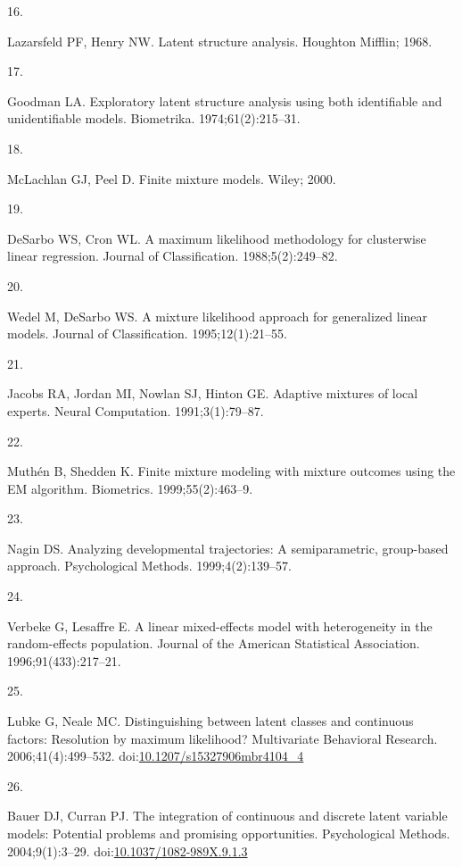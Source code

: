 \documentclass[
  11pt,
]{article}
\newlength{\cslhangindent}
\newlength{\csllabelwidth}
\newenvironment{CSLReferences}[2] %
 {\begin{list}{}{%
  \setlength{\itemindent}{0pt}
  \setlength{\leftmargin}{0pt}
  \setlength{\parsep}{0pt}
  \ifodd #1
   \setlength{\leftmargin}{\cslhangindent}
   \setlength{\itemindent}{-1\cslhangindent}
  \fi
  \setlength{\itemsep}{#2\baselineskip}}}
 {\end{list}}
\newcommand{\CSLLeftMargin}[1]{\parbox[t]{\csllabelwidth}{\strut#1\strut}}
\newcommand{\CSLRightInline}[1]{\parbox[t]{\linewidth - \csllabelwidth}{\strut#1\strut}}
\begin{document}
\begin{CSLReferences}{0}{1}
\CSLLeftMargin{16. }%
\CSLRightInline{Lazarsfeld PF, Henry NW. Latent structure analysis. Houghton Mifflin; 1968.}

\CSLLeftMargin{17. }%
\CSLRightInline{Goodman LA. Exploratory latent structure analysis using both identifiable and unidentifiable models. Biometrika. 1974;61(2):215--31.}

\CSLLeftMargin{18. }%
\CSLRightInline{McLachlan GJ, Peel D. Finite mixture models. Wiley; 2000.}

\CSLLeftMargin{19. }%
\CSLRightInline{DeSarbo WS, Cron WL. A maximum likelihood methodology for clusterwise linear regression. Journal of Classification. 1988;5(2):249--82.}

\CSLLeftMargin{20. }%
\CSLRightInline{Wedel M, DeSarbo WS. A mixture likelihood approach for generalized linear models. Journal of Classification. 1995;12(1):21--55.}

\CSLLeftMargin{21. }%
\CSLRightInline{Jacobs RA, Jordan MI, Nowlan SJ, Hinton GE. Adaptive mixtures of local experts. Neural Computation. 1991;3(1):79--87.}

\CSLLeftMargin{22. }%
\CSLRightInline{Muthén B, Shedden K. Finite mixture modeling with mixture outcomes using the {EM} algorithm. Biometrics. 1999;55(2):463--9.}

\CSLLeftMargin{23. }%
\CSLRightInline{Nagin DS. Analyzing developmental trajectories: A semiparametric, group-based approach. Psychological Methods. 1999;4(2):139--57.}

\CSLLeftMargin{24. }%
\CSLRightInline{Verbeke G, Lesaffre E. A linear mixed-effects model with heterogeneity in the random-effects population. Journal of the American Statistical Association. 1996;91(433):217--21.}

\CSLLeftMargin{25. }%
\CSLRightInline{Lubke G, Neale MC. Distinguishing between latent classes and continuous factors: Resolution by maximum likelihood? Multivariate Behavioral Research. 2006;41(4):499--532. doi:\href{https://doi.org/10.1207/s15327906mbr4104_4}{10.1207/s15327906mbr4104\_4}}

\CSLLeftMargin{26. }%
\CSLRightInline{Bauer DJ, Curran PJ. The integration of continuous and discrete latent variable models: Potential problems and promising opportunities. Psychological Methods. 2004;9(1):3--29. doi:\href{https://doi.org/10.1037/1082-989X.9.1.3}{10.1037/1082-989X.9.1.3}}


\end{CSLReferences}
\end{document}
